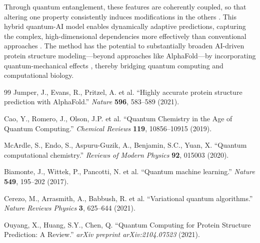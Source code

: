\documentclass[11pt,a4paper]{article}
\begin{document}
Through quantum entanglement, these features are coherently coupled, so that altering one property consistently induces modifications in the others \cite{biamonte2017quantum}. This hybrid quantum-AI model enables dynamically adaptive predictions, capturing the complex, high-dimensional dependencies more effectively than conventional approaches \cite{cerezo2021variational}. The method has the potential to substantially broaden AI-driven protein structure modeling—beyond approaches like AlphaFold—by incorporating quantum-mechanical effects \cite{ouyang2021protein}, thereby bridging quantum computing and computational biology.

\begin{thebibliography}{99}
Jumper, J., Evans, R., Pritzel, A. et al. ``Highly accurate protein structure prediction with AlphaFold.'' \textit{Nature} \textbf{596}, 583–589 (2021).

Cao, Y., Romero, J., Olson, J.P. et al. ``Quantum Chemistry in the Age of Quantum Computing.'' \textit{Chemical Reviews} \textbf{119}, 10856–10915 (2019).

McArdle, S., Endo, S., Aspuru-Guzik, A., Benjamin, S.C., Yuan, X. ``Quantum computational chemistry.'' \textit{Reviews of Modern Physics} \textbf{92}, 015003 (2020).

Biamonte, J., Wittek, P., Pancotti, N. et al. ``Quantum machine learning.'' \textit{Nature} \textbf{549}, 195–202 (2017).

Cerezo, M., Arrasmith, A., Babbush, R. et al. ``Variational quantum algorithms.'' \textit{Nature Reviews Physics} \textbf{3}, 625–644 (2021).

Ouyang, X., Huang, S.Y., Chen, Q. ``Quantum Computing for Protein Structure Prediction: A Review.'' \textit{arXiv preprint arXiv:2104.07523} (2021).
\end{thebibliography}
\end{document}
